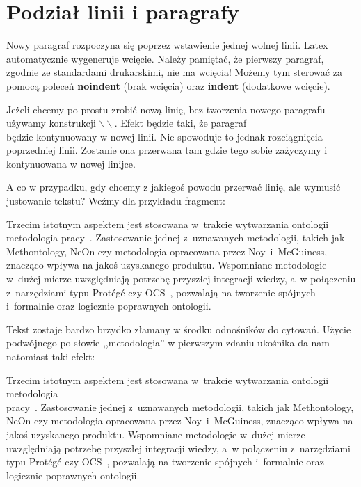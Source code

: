 \section{Podział linii i paragrafy}
\label{podzial}

Nowy paragraf rozpoczyna się poprzez wstawienie jednej wolnej linii. Latex automatycznie wygeneruje wcięcie. Należy pamiętać, że pierwszy paragraf, zgodnie ze standardami drukarskimi, nie ma wcięcia! Możemy tym sterować za pomocą poleceń \textbf{noindent} (brak wcięcia) oraz \textbf{indent} (dodatkowe wcięcie).

Jeżeli chcemy po prostu zrobić nową linię, bez tworzenia nowego paragrafu używamy konstrukcji $\backslash\backslash$. Efekt będzie taki, że paragraf\\
będzie kontynuowany w nowej linii. Nie spowoduje to jednak rozciągnięcia poprzedniej linii. Zostanie ona przerwana tam gdzie tego sobie zażyczymy i kontynuowana w nowej linijce.

A co w przypadku, gdy chcemy z jakiegoś powodu przerwać linię, ale wymusić justowanie tekstu? Weźmy dla przykładu fragment:

Trzecim istotnym aspektem jest stosowana w~trakcie wytwarzania ontologii metodologia pracy~\cite{boinski2012kaskbook,boinski2011security}. Zastosowanie jednej z~uznawanych metodologii, takich jak Methontology, NeOn czy metodologia opracowana przez Noy~i~McGuiness, znacząco wpływa na jakoś uzyskanego produktu. Wspomniane metodologie w~dużej mierze uwzględniają potrzebę przyszłej integracji wiedzy, a~w połączeniu z~narzędziami typu Protégé czy OCS~\cite{boinski2007kaskbook,boinski2009ocs,boinski2010zespolowa}, pozwalają na tworzenie spójnych i~formalnie oraz logicznie poprawnych ontologii.

Tekst zostaje bardzo brzydko złamany w środku odnośników do cytowań. Użycie podwójnego po słowie ,,metodologia'' w pierwszym zdaniu ukośnika da nam natomiast taki efekt:

Trzecim istotnym aspektem jest stosowana w~trakcie wytwarzania ontologii metodologia \\ pracy~\cite{boinski2012kaskbook,boinski2011security}. Zastosowanie jednej z~uznawanych metodologii, takich jak Methontology, NeOn czy metodologia opracowana przez Noy~i~McGuiness, znacząco wpływa na jakoś uzyskanego produktu. Wspomniane metodologie w~dużej mierze uwzględniają potrzebę przyszłej integracji wiedzy, a~w połączeniu z~narzędziami typu Protégé czy OCS~\cite{boinski2007kaskbook,boinski2009ocs,boinski2010zespolowa}, pozwalają na tworzenie spójnych i~formalnie oraz logicznie poprawnych ontologii.

